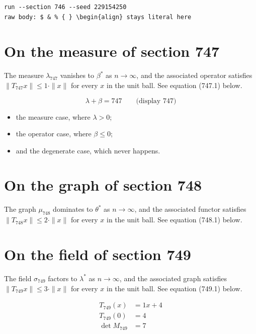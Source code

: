 \documentclass{article}
\begin{document}
\begin{verbatim}
run --section 746 --seed 229154250
raw body: $ & % { } \begin{align} stays literal here
\end{verbatim}

\section{On the measure of section 747}
The measure $\lambda_{747}$ vanishes to $\beta^{*}$ as $n \to \infty$,
and the associated operator satisfies $\|T_{747} x\| \leq 1 \cdot \|x\|$
for every $x$ in the unit ball. See equation (747.1) below.

$$
\lambda + \beta = 747 \qquad \text{(display 747)}
$$

\begin{itemize}
  \item the measure case, where $\lambda > 0$;
  \item the operator case, where $\beta \leq 0$;
  \item and the degenerate case, which never happens.
\end{itemize}

\section{On the graph of section 748}
The graph $\mu_{748}$ dominates to $\theta^{*}$ as $n \to \infty$,
and the associated functor satisfies $\|T_{748} x\| \leq 2 \cdot \|x\|$
for every $x$ in the unit ball. See equation (748.1) below.

\section{On the field of section 749}
The field $\sigma_{749}$ factors to $\lambda^{*}$ as $n \to \infty$,
and the associated graph satisfies $\|T_{749} x\| \leq 3 \cdot \|x\|$
for every $x$ in the unit ball. See equation (749.1) below.

\begin{align}
T_{749}(x) &= 1 x + 4 \\
T_{749}(0) &= 4 \\
\det M_{749} &= 7
\end{align}
\end{document}
